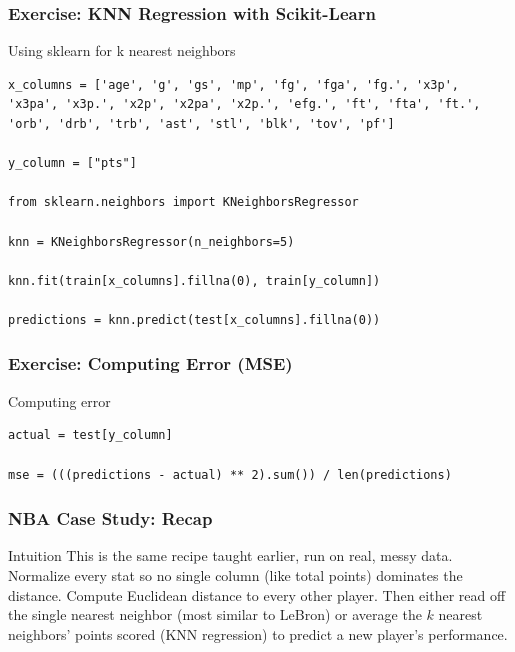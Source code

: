 \begin{frame}[fragile]\frametitle{Exercise: KNN Regression with Scikit-Learn}
Using sklearn for k nearest neighbors
\begin{lstlisting}
x_columns = ['age', 'g', 'gs', 'mp', 'fg', 'fga', 'fg.', 'x3p', 'x3pa', 'x3p.', 'x2p', 'x2pa', 'x2p.', 'efg.', 'ft', 'fta', 'ft.', 'orb', 'drb', 'trb', 'ast', 'stl', 'blk', 'tov', 'pf']

y_column = ["pts"]

from sklearn.neighbors import KNeighborsRegressor

knn = KNeighborsRegressor(n_neighbors=5)

knn.fit(train[x_columns].fillna(0), train[y_column])

predictions = knn.predict(test[x_columns].fillna(0))
\end{lstlisting}
\end{frame}

\begin{frame}[fragile]\frametitle{Exercise: Computing Error (MSE)}
Computing error
\begin{lstlisting}
actual = test[y_column]

mse = (((predictions - actual) ** 2).sum()) / len(predictions)
\end{lstlisting}
\end{frame}

\begin{frame}[fragile]\frametitle{NBA Case Study: Recap}
\begin{block}{Intuition}
This is the same recipe taught earlier, run on real, messy data. Normalize every stat so
no single column (like total points) dominates the distance. Compute Euclidean distance
to every other player. Then either read off the single nearest neighbor (most similar to
LeBron) or average the $k$ nearest neighbors' points scored (KNN regression) to predict a
new player's performance.
\end{block}
\end{frame}
